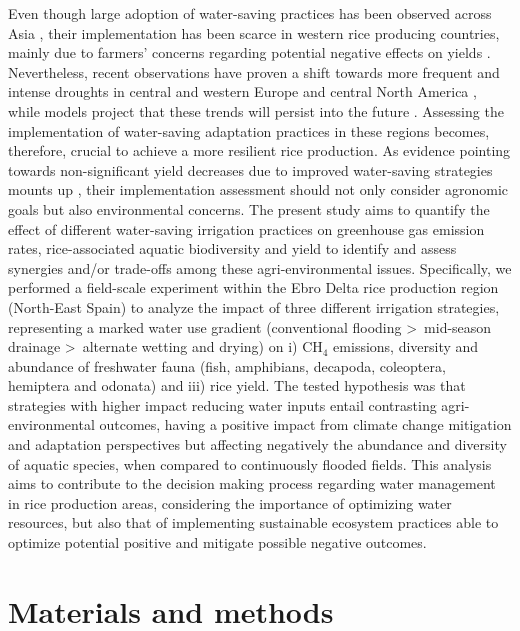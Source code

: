 Even though large adoption of water-saving practices has been observed across Asia \citep{lampayan2015}, their implementation has been scarce in western rice producing countries, mainly due to farmers' concerns regarding potential negative effects on yields \citep{carrijo2017}. Nevertheless, recent observations have proven a shift towards more frequent and intense droughts in central and western Europe and central North America \citep{masson2021ipcc}, while models project that these trends will persist into the future \citep{berg2018}. Assessing the implementation of water-saving adaptation practices in these regions becomes, therefore, crucial to achieve a more resilient rice production. As evidence pointing towards non-significant yield decreases due to improved water-saving strategies mounts up \citep{linquist2015, martinez-eixarch2021, monaco2021}, their implementation assessment should not only consider agronomic goals but also environmental concerns. The present study aims to quantify the effect of different water-saving irrigation practices on greenhouse gas emission rates, rice-associated aquatic biodiversity and yield to identify and assess synergies and/or trade-offs among these agri-environmental issues. Specifically, we performed a field-scale experiment within the Ebro Delta rice production region (North-East Spain) to analyze the impact of three different irrigation strategies, representing a marked water use gradient (conventional flooding \textgreater\ mid-season drainage \textgreater\ alternate wetting and drying) on i) CH$_{4}$ emissions, diversity and abundance of freshwater fauna (fish, amphibians, decapoda, coleoptera, hemiptera and odonata) and iii) rice yield. The tested hypothesis was that strategies with higher impact reducing water inputs entail contrasting agri-environmental outcomes, having a positive impact from climate change mitigation and adaptation perspectives but affecting negatively the abundance and diversity of aquatic species, when compared to continuously flooded fields. This analysis aims to contribute to the decision making process regarding water management in rice production areas, considering the importance of optimizing water resources, but also that of implementing sustainable ecosystem practices able to optimize potential positive and mitigate possible negative outcomes.

\section{Materials and methods}
\label{sec:meth1}

